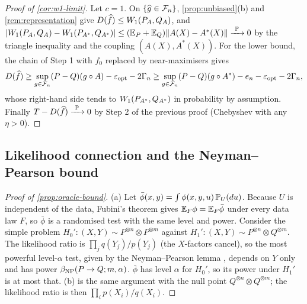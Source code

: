 \begin{proof}[Proof of \cref{cor:w1-limit}]
Let $c=1$. On $\{\widehat{g}\in\mathcal F_n\}$, \cref{prop:unbiased}(b) and \cref{rem:representation}
give $D(\widehat{f})\le W_{1}(P_A,Q_A)$, and
$\lvert W_{1}(P_A,Q_A)-W_{1}(P_{A^*},Q_{A^*})\rvert\le(\mathbb{E}_P+\mathbb{E}_Q)\lVert A(X)-A^*(X)\rVert\xrightarrow{\ \mathbb{P}\ }0$ by the triangle
inequality and the coupling $(A(X),A^*(X))$. For the lower bound, the chain of Step 1 with $f_0$
replaced by near-maximisers gives
\[
  D(\widehat{f})\ge\sup_{g\in\mathcal F_n}(P-Q)(g\circ A)-\varepsilon_{\mathrm{opt}}-2\Gamma_n
  \ge\sup_{g\in\mathcal F_n}(P-Q)(g\circ A^*)-e_n-\varepsilon_{\mathrm{opt}}-2\Gamma_n ,
\]
whose right-hand side tends to $W_{1}(P_{A^*},Q_{A^*})$ in probability by assumption. Finally
$T-D(\widehat{f})\xrightarrow{\ \mathbb{P}\ }0$ by Step 2 of the previous proof (Chebyshev with any $\eta>0$).
\end{proof}

\subsection{Likelihood connection and the Neyman--Pearson bound}\label{app:proofs-likelihood}

\begin{proof}[Proof of \cref{prop:oracle-bound}]
(a) Let $\bar\phi(x,y)=\int\phi(x,y,u)\,\mathbb{P}_U(du)$. Because $U$ is independent of the data,
Fubini's theorem gives $\mathbb{E}_F\phi=\mathbb{E}_F\bar\phi$ under every data law $F$, so $\bar\phi$ is a
randomised test with the same level and power. Consider the simple problem
$H_0':(X,Y)\sim P^{\otimes n}\otimes P^{\otimes m}$ against
$H_1':(X,Y)\sim P^{\otimes n}\otimes Q^{\otimes m}$. The likelihood ratio is $\prod_jq(Y_j)/p(Y_j)$
(the $X$-factors cancel), so the most powerful level-$\alpha$ test, given by the
Neyman--Pearson lemma \citep[Thm.~3.2.1]{lehmann2022testing}, depends on $Y$ only and has power
$\beta_{\mathrm{NP}}(P\to Q;m,\alpha)$. $\bar\phi$ has level $\alpha$ for $H_0'$, so its power under $H_1'$ is at
most that. (b) is the same argument with the null point $Q^{\otimes n}\otimes Q^{\otimes m}$; the
likelihood ratio is then $\prod_ip(X_i)/q(X_i)$.
\end{proof}

